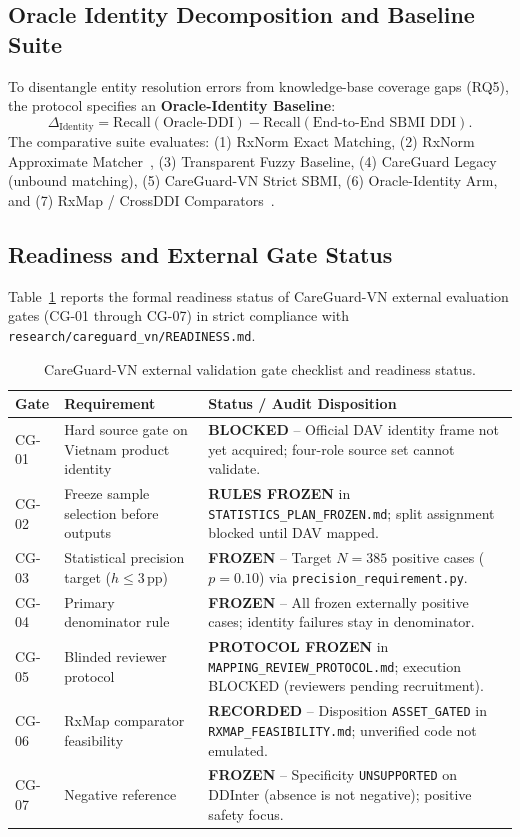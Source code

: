 \documentclass[11pt]{article}
\begin{document}
\subsection{Oracle Identity Decomposition and Baseline Suite}
To disentangle entity resolution errors from knowledge-base coverage gaps (RQ5), the protocol specifies an \textbf{Oracle-Identity Baseline}:
\begin{equation}
\Delta_{\text{Identity}} = \mathrm{Recall}(\text{Oracle-DDI}) - \mathrm{Recall}(\text{End-to-End SBMI DDI}).
\end{equation}
The comparative suite evaluates: (1) RxNorm Exact Matching, (2) RxNorm Approximate Matcher~\cite{peters2011approx}, (3) Transparent Fuzzy Baseline, (4) CareGuard Legacy (unbound matching), (5) CareGuard-VN Strict SBMI, (6) Oracle-Identity Arm, and (7) RxMap / CrossDDI Comparators~\cite{korpela2026rxmap,crossddi2026}.

\subsection{Readiness and External Gate Status}
Table~\ref{tab:gate_status} reports the formal readiness status of CareGuard-VN external evaluation gates (CG-01 through CG-07) in strict compliance with \texttt{research/careguard\_vn/READINESS.md}.

\begin{table}[H]
\centering
\caption{CareGuard-VN external validation gate checklist and readiness status.}
\label{tab:gate_status}
\small
\begin{tabularx}{\textwidth}{lp{4.2cm}X}
\toprule
\textbf{Gate} & \textbf{Requirement} & \textbf{Status / Audit Disposition} \\
\midrule
CG-01 & Hard source gate on Vietnam product identity & \textbf{BLOCKED} -- Official DAV identity frame not yet acquired; four-role source set cannot validate. \\
CG-02 & Freeze sample selection before outputs & \textbf{RULES FROZEN} in \texttt{STATISTICS\_PLAN\_FROZEN.md}; split assignment blocked until DAV mapped. \\
CG-03 & Statistical precision target ($h \le 3\,\text{pp}$) & \textbf{FROZEN} -- Target $N=385$ positive cases ($p=0.10$) via \texttt{precision\_requirement.py}. \\
CG-04 & Primary denominator rule & \textbf{FROZEN} -- All frozen externally positive cases; identity failures stay in denominator. \\
CG-05 & Blinded reviewer protocol & \textbf{PROTOCOL FROZEN} in \texttt{MAPPING\_REVIEW\_PROTOCOL.md}; execution BLOCKED (reviewers pending recruitment). \\
CG-06 & RxMap comparator feasibility & \textbf{RECORDED} -- Disposition \texttt{ASSET\_GATED} in \texttt{RXMAP\_FEASIBILITY.md}; unverified code not emulated. \\
CG-07 & Negative reference & \textbf{FROZEN} -- Specificity \texttt{UNSUPPORTED} on DDInter (absence is not negative); positive safety focus. \\
\bottomrule
\end{tabularx}
\end{table}
\end{document}
